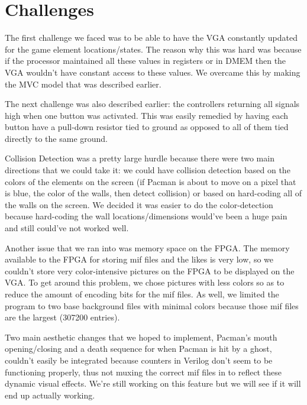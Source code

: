 \documentclass[letterpaper]{article} %
\begin{document}
\section{Challenges}
	The first challenge we faced was to be able to have the VGA constantly updated for the game element locations/states. The reason why this was hard was because if the processor maintained all these values in registers or in DMEM then the VGA wouldn't have constant access to these values. We overcame this by making the MVC model that was described earlier. \par
	The next challenge was also described earlier: the controllers returning all signals high when one button was activated. This was easily remedied by having each button have a pull-down resistor tied to ground as opposed to all of them tied directly to the same ground. \par
	Collision Detection was a pretty large hurdle because there were two main directions that we could take it: we could have collision detection based on the colors of the elements on the screen (if Pacman is about to move on a pixel that is blue, the color of the walls, then detect collision) or  based on hard-coding all of the walls on the screen. We decided it was easier to do the color-detection because hard-coding the wall locations/dimensions would've been a huge pain and still could've not worked well. \par
	Another issue that we ran into was memory space on the FPGA. The memory available to the FPGA for storing mif files and the likes is very low, so we couldn't store very color-intensive pictures on the FPGA to be displayed on the VGA. To get around this problem, we chose pictures with less colors so as to reduce the amount of encoding bits for the mif files. As well, we limited the program to two base background files with minimal colors because those mif files are the largest (307200 entries). \par
	Two main aesthetic changes that we hoped to implement, Pacman's mouth opening/closing and a death sequence for when Pacman is hit by a ghost, couldn't easily be integrated because counters in Verilog don't seem to be functioning properly, thus not muxing the correct mif files in to reflect these dynamic visual effects. We're still working on this feature but we will see if it will end up actually working. \par
	
\end{document}
